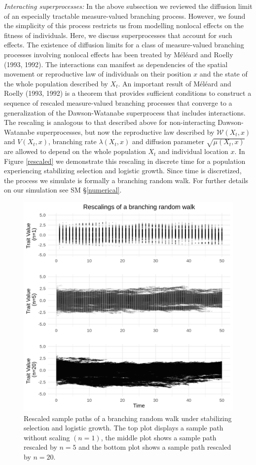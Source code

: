\documentclass[]{elsarticle} %
\begin{document}
\emph{Interacting superprocesses:} In the above subsection we reviewed
the diffusion limit of an especially tractable measure-valued branching
process. However, we found the simplicity of this process restricts us
from modelling nonlocal effects on the fitness of individuals. Here, we
discuss superprocesses that account for such effects. The existence of
diffusion limits for a class of measure-valued branching processes
involving nonlocal effects has been treated by Méléard and Roelly (1993,
1992). The interactions can manifest as dependencies of the spatial
movement or reproductive law of individuals on their position \(x\) and
the state of the whole population described by \(X_t\). An important
result of Méléard and Roelly (1993, 1992) is a theorem that provides
sufficient conditions to construct a sequence of rescaled measure-valued
branching processes that converge to a generalization of the
Dawson-Watanabe superprocess that includes interactions. The rescaling
is analogous to that described above for non-interacting Dawson-Watanabe
superprocesses, but now the reproductive law described by
\(\mathscr{W}(X_t,x)\) and \(V(X_t,x)\), branching rate
\(\lambda(X_t,x)\) and diffusion parameter \(\sqrt{\mu(X_t,x)}\) are
allowed to depend on the whole population \(X_t\) and individual
location \(x\). In Figure \ref{rescaled} we demonstrate this rescaling
in discrete time for a population experiencing stabilizing selection and
logistic growth. Since time is discretized, the process we simulate is
formally a branching random walk. For further details on our simulation
see SM \S\ref{numerical}.

\begin{figure}

{\centering \includegraphics[width=0.8\linewidth]{rescaled_plots} 

}

\caption{\label{rescaled}Rescaled sample paths of a branching random walk under stabilizing selection and logistic growth. The top plot displays a sample path without scaling $(n=1)$, the middle plot shows a sample path rescaled by $n=5$ and the bottom plot shows a sample path rescaled by $n=20$.}\label{fig:unnamed-chunk-4}
\end{figure}
\end{document}
